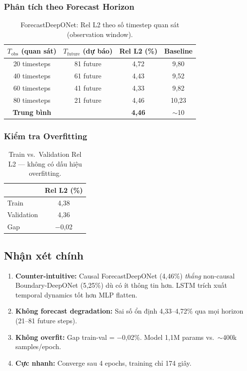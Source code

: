 \documentclass[12pt,a4paper]{article}
\begin{document}
\subsubsection{Phân tích theo Forecast Horizon}

\begin{table}[ht]
  \centering
  \caption{ForecastDeepONet: Rel L2 theo số timestep quan sát (observation window).}
  \label{tab:horizon}
  \begin{tabular}{@{}cccc@{}}
    \toprule
    $T_\mathrm{obs}$ (quan sát) & $T_\mathrm{future}$ (dự báo) & Rel L2 (\%) & Baseline \\
    \midrule
    20 timesteps & 81 future & 4,72 & 9,80 \\
    40 timesteps & 61 future & 4,43 & 9,52 \\
    60 timesteps & 41 future & 4,33 & 9,82 \\
    80 timesteps & 21 future & 4,46 & 10,23 \\
    \midrule
    \textbf{Trung bình} & & \textbf{4,46} & $\sim$10 \\
    \bottomrule
  \end{tabular}
\end{table}

\subsubsection{Kiểm tra Overfitting}

\begin{table}[ht]
  \centering
  \caption{Train vs.\ Validation Rel L2 --- không có dấu hiệu overfitting.}
  \label{tab:overfit}
  \begin{tabular}{@{}lc@{}}
    \toprule
    & Rel L2 (\%) \\
    \midrule
    Train & 4,38 \\
    Validation & 4,36 \\
    Gap & $-$0,02 \\
    \bottomrule
  \end{tabular}
\end{table}

\subsection{Nhận xét chính}

\begin{enumerate}[nosep]
  \item \textbf{Counter-intuitive:} Causal ForecastDeepONet (4,46\%) \emph{thắng} non-causal Boundary-DeepONet (5,25\%) dù có ít thông tin hơn. LSTM trích xuất temporal dynamics tốt hơn MLP flatten.
  \item \textbf{Không forecast degradation:} Sai số ổn định 4,33--4,72\% qua mọi horizon (21--81 future steps).
  \item \textbf{Không overfit:} Gap train-val = $-$0,02\%. Model 1,1M params vs.\ $\sim$400k samples/epoch.
  \item \textbf{Cực nhanh:} Converge sau 4 epochs, training chỉ 174 giây.
\end{enumerate}
\end{document}
